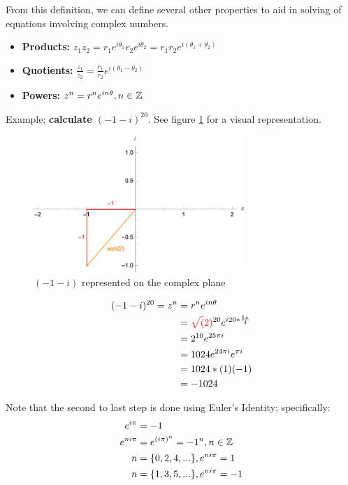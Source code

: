 \documentclass[12pt]{article}
\begin{document}
From this definition, we can define several other properties to aid in solving of equations involving complex numbers.

\begin{itemize}
    \item \textbf{Products:} $z_1z_2 = r_1 e^{i\theta_1} r_2 e^{i\theta_2} = r_1 r_2 e^{i(\theta_1+\theta_2)}$
    \item \textbf{Quotients:} $\frac{z_1}{z_2} = \frac{r_1}{r_2} e^{i(\theta_1-\theta_2)}$
    \item \textbf{Powers:} $z^n = r^n e^{i n \theta}, n \in \mathbb{Z}$
\end{itemize}

Example; \textbf{calculate $(-1-i)^{20}$}. See figure \ref{fig:demoivreseg} for a visual representation.

\begin{figure}[!ht]
    \centering
    \includegraphics[width=8cm]{misc/demoivresexample.png}
    \caption{$(-1-i)$ represented on the complex plane}
    \label{fig:demoivreseg}
\end{figure}

\begin{equation}
    \begin{split}
        (-1-i)^{20} = z^n &= r^n e^{i n \theta}\\
        &= \textcolor{red}{\sqrt(2)}^{20} e^{i 20 * \frac{5\pi}{4}}\\
        &= 2^{10} e^{25 \pi i }\\
        &= 1024 e^{24 \pi i} e^{\pi i}\\
        &= 1024 * (1) (-1) \\
        &= -1024
    \end{split}
\end{equation}

Note that the second to last step is done using Euler's Identity; specifically:
\begin{equation}
    \begin{split}
        e^{i \pi} &= -1\\
        e^{n i\pi} &= e^{{(i\pi)}^{n}}= -1^{n}, n \in \mathbb{Z}\\
        n &= \{0, 2, 4, ...\}, e^{n i \pi} = 1\\
        n &= \{1, 3, 5, ...\}, e^{n i \pi} = -1\\
    \end{split}
\end{equation}
\end{document}
